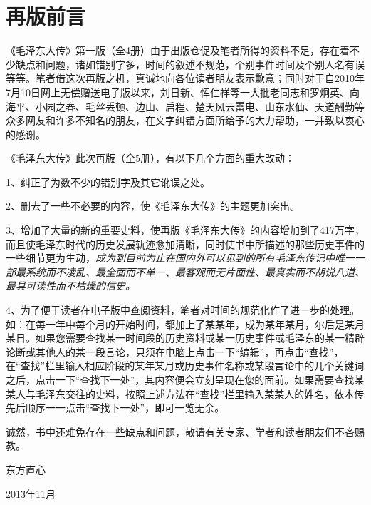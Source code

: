 \documentclass[../../dazhuan.tex]{subfiles}
\begin{document}
\clearpage
\chapter*{再版前言}

   
《毛泽东大传》第一版（全4册）由于出版仓促及笔者所得的资料不足，存在着不少缺点和问题，诸如错别字多，时间的叙述不规范，个别事件时间及个别人名有误等等。笔者借这次再版之机，真诚地向各位读者朋友表示歉意；同时对于自2010年7月10日网上无偿赠送电子版以来，刘日新、恽仁祥等一大批老同志和罗炯英、向海平、小园之春、毛丝丢顿、边山、启程、楚天风云雷电、山东水仙、天道酬勤等众多网友和许多不知名的朋友，在文字纠错方面所给予的大力帮助，一并致以衷心的感谢。

《毛泽东大传》此次再版（全5册），有以下几个方面的重大改动：

1、纠正了为数不少的错别字及其它讹误之处。

2、删去了一些不必要的内容，使《毛泽东大传》的主题更加突出。

3、增加了大量的新的重要史料，使再版《毛泽东大传》的内容增加到了417万字，而且使毛泽东时代的历史发展轨迹愈加清晰，同时使书中所描述的那些历史事件的一些细节更为生动，\emph{成为到目前为止在国内外可以见到的所有毛泽东传记中唯一一部最系统而不凌乱、最全面而不单一、最客观而无片面性、最真实而不胡说八道、最具可读性而不枯燥的信史。}

4、为了便于读者在电子版中查阅资料，笔者对时间的规范化作了进一步的处理。如：在每一年中每个月的开始时间，都加上了某某年，成为某年某月，尔后是某月某日。如果您需要查找某一时间段的历史资料或某一历史事件或毛泽东的某一精辟论断或其他人的某一段言论，只须在电脑上点击一下“编辑”，再点击“查找”，在“查找”栏里输入相应阶段的某年某月或历史事件名称或某段言论中的几个关键词之后，点击一下“查找下一处”，其内容便会立刻呈现在您的面前。如果需要查找某某人与毛泽东交往的史料，按照上述方法在“查找”栏里输入某某人的姓名，依本传先后顺序一一点击“查找下一处”，即可一览无余。

诚然，书中还难免存在一些缺点和问题，敬请有关专家、学者和读者朋友们不吝赐教。

\vspace{\baselineskip}

\hspace{18em} 东方直心

\hspace{18em} 2013年11月
\end{document}
